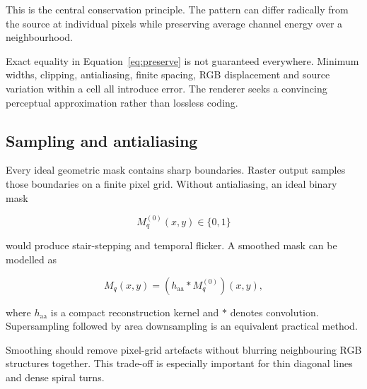 This is the central conservation principle. The pattern can differ radically from the source at individual pixels while preserving average channel energy over a neighbourhood.

\begin{warningbox}
Exact equality in Equation~\eqref{eq:preserve} is not guaranteed everywhere. Minimum widths, clipping, antialiasing, finite spacing, RGB displacement and source variation within a cell all introduce error. The renderer seeks a convincing perceptual approximation rather than lossless coding.
\end{warningbox}

\subsection{Sampling and antialiasing}

Every ideal geometric mask contains sharp boundaries. Raster output samples those boundaries on a finite pixel grid. Without antialiasing, an ideal binary mask

\begin{equation}
M_q^{(0)}(x,y)\in\{0,1\}
\end{equation}

would produce stair-stepping and temporal flicker. A smoothed mask can be modelled as

\begin{equation}
M_q(x,y)=
\left(h_{\mathrm{aa}}*M_q^{(0)}\right)(x,y),
\label{eq:aa}
\end{equation}

where $h_{\mathrm{aa}}$ is a compact reconstruction kernel and $*$ denotes convolution. Supersampling followed by area downsampling is an equivalent practical method.

Smoothing should remove pixel-grid artefacts without blurring neighbouring RGB structures together. This trade-off is especially important for thin diagonal lines and dense spiral turns.


